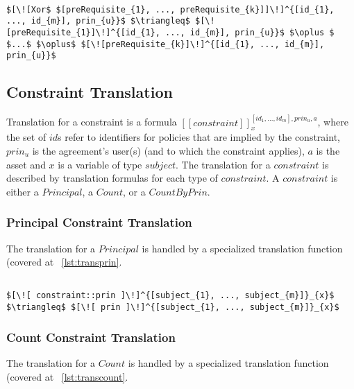 \lstset{mathescape, language=AST}  
\begin{lstlisting}[frame=single, caption={Prerequisite Translation {$\colon$} Exclusive Disjunction},label={lst:transpreRequisiteXorPrqs}]

$[\![Xor$ $[preRequisite_{1}, ..., preRequisite_{k}]]\!]^{[id_{1}, ..., id_{m}], prin_{u}}$ $\triangleq$ $[\![preRequisite_{1}]\!]^{[id_{1}, ..., id_{m}], prin_{u}}$ $\oplus $ $...$ $\oplus$ $[\![preRequisite_{k}]\!]^{[id_{1}, ..., id_{m}], prin_{u}}$

\end{lstlisting}


\subsection{Constraint Translation}

Translation for a constraint is a formula $[\![constraint]\!]^{[id_{1}, ..., id_{m}], prin_{u}, a}_{x}$, where the set of $id$s refer to identifiers for policies that are implied by the constraint, $prin_{u}$ is the agreement's user(s) (and to which the constraint applies), $a$ is the asset and $x$ is a variable of type $subject$. The translation for a $constraint$ is described by translation formulas for each type of $constraint$. A $constraint$ is either a $Principal$, a $Count$, or a $CountByPrin$.

\subsubsection{Principal Constraint Translation}
The translation for a $Principal$ is handled by a specialized translation function (covered at ~\ref{lst:transprin}.   

\lstset{mathescape, language=AST}  
\begin{lstlisting}[frame=single, caption={Constraint Translation {$\colon$} Principal},label={lst:transconstraintPrin}]

$[\![ constraint::prin ]\!]^{[subject_{1}, ..., subject_{m}]}_{x}$ $\triangleq$ $[\![ prin ]\!]^{[subject_{1}, ..., subject_{m}]}_{x}$ 
\end{lstlisting}

\subsubsection{Count Constraint Translation}
The translation for a $Count$ is handled by a specialized translation function (covered at ~\ref{lst:transcount}.

